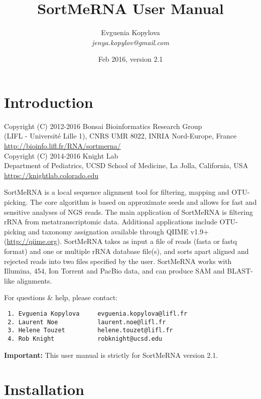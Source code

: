 \documentclass[10pt,a4paper]{article}
\title{SortMeRNA User Manual}
\author{Evguenia Kopylova\\ {\em jenya.kopylov@gmail.com}}
\date{Feb 2016, version 2.1}
\begin{document}
\maketitle

\newpage
\tableofcontents

\newpage
\section{Introduction}

Copyright (C) 2012-2016 Bonsai Bioinformatics Research Group \\
(LIFL - Universit\'{e} Lille 1), CNRS UMR 8022, INRIA Nord-Europe, France \\
\url{http://bioinfo.lifl.fr/RNA/sortmerna/} \\
Copyright (C) 2014-2016 Knight Lab \\
Department of Pediatrics, UCSD School of Medicine, La Jolla, California, USA\\
\url{https://knightlab.colorado.edu}

SortMeRNA is a local sequence alignment tool for filtering, mapping and OTU-picking.
The core algorithm is based on approximate seeds and allows for fast and sensitive analyses
of NGS reads. The main application of SortMeRNA is filtering rRNA from metatranscriptomic data.
Additional applications include OTU-picking and taxonomy assignation available through QIIME v1.9+ (\url{http://qiime.org}).
SortMeRNA takes as input a file of reads (fasta or fastq format) and one or multiple rRNA
database file(s), and sorts apart aligned and rejected reads into two files specified by the user.
SortMeRNA works with Illumina, 454, Ion Torrent and PacBio data, and can produce SAM and
BLAST-like alignments.

For questions \& help, please contact:

\begin{verbatim}
 1. Evguenia Kopylova     evguenia.kopylova@lifl.fr
 2. Laurent Noe           laurent.noe@lifl.fr
 3. Helene Touzet         helene.touzet@lifl.fr
 4. Rob Knight            robknight@ucsd.edu
\end{verbatim}

{\bf Important:} This user manual is strictly for SortMeRNA version 2.1. 


\section{Installation}
\end{document}

